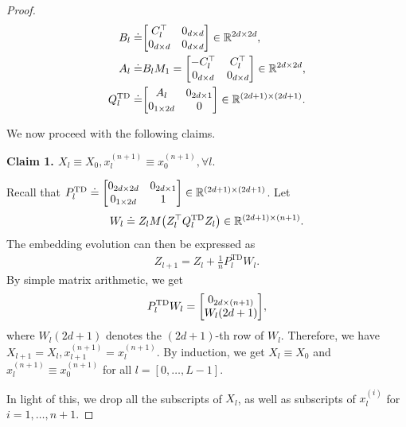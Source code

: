 \documentclass{article}
\newcommand{\R}{\mathbb{R}}
\newcommand{\td}{\text{TD}}
\begin{document}
\begin{proof}
\begin{align}
  B_l \doteq& \mqty[C_l^\top & 0_{d\times d} \\ 0_{d \times d} & 0_{d \times d}] \in \R^{2d \times 2d},\\
  A_l \doteq& B_l M_1  = \mqty[-C_l^\top & C_l^\top \\ 0_{d \times d} & 0_{d \times d}] \in \R^{2d \times 2d},\\
  Q_l^{\td} \doteq& \mqty[A_l & 0_{2d \times 1} \\ 0_{1 \times 2d} & 0] \in \R^{(2d + 1) \times (2d+1)}.
\end{align}

We now proceed with the following claims. 

    \textbf{Claim 1. $X_l \equiv X_0 , x_l^{(n+1)} \equiv x_0^{(n+1)}, \forall l.$}
    
    Recall that $ P_l^{\td} \doteq \mqty[0_{2d \times 2d} & 0_{2d \times 1} \\ 0_{1 \times 2d} & 1]
    \in \R^{(2d+1) \times (2d+1)}$.
    Let
    \begin{align}
        W_l \doteq Z_l M \qty(Z_l^\top Q_l^{\td} Z_l) \in \R^{(2d+1) \times (n+1)}.
    \end{align}
    The embedding evolution can then be expressed as
    \begin{align}
        Z_{l+1} = Z_l + \frac{1}{n} P_l^{\td} W_l.
    \end{align}
    By simple matrix arithmetic, we get
    \begin{align}
        P_l^{\td} W_l = \mqty[0_{2d \times (n+1)}\\
                        W_l(2d+1)],
    \end{align}
    where $W_l(2d+1)$ denotes the $(2d + 1)$-th row of $W_l$.
    Therefore, we have $X_{l+1} = X_l, x_{l+1}^{(n+1)} = x_l^{(n+1)}$.
    By induction, we get $X_l \equiv X_0$ and $x_l^{(n+1)} \equiv x_0^{(n+1)}$ for all $l = [0,\dots,L-1]$.
    
    
    In light of this,
    we drop all the subscripts of $X_l$,
    as well as subscripts of $x_l^{(i)}$ for $i=1,\dots, n+1$. 



\end{proof}
\end{document}
